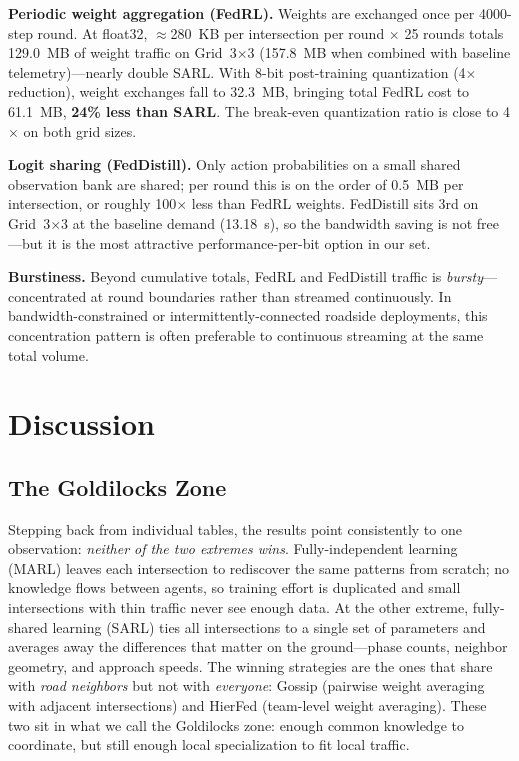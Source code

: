 \documentclass[conference]{IEEEtran}
\begin{document}
\textbf{Periodic weight aggregation (FedRL).} Weights are exchanged once per 4000-step round. At float32, $\approx$280~KB per intersection per round $\times$ 25 rounds totals 129.0~MB of weight traffic on Grid~3$\times$3 (157.8~MB when combined with baseline telemetry)---nearly double SARL. With 8-bit post-training quantization (4$\times$ reduction), weight exchanges fall to 32.3~MB, bringing total FedRL cost to 61.1~MB, \textbf{24\% less than SARL}. The break-even quantization ratio is close to 4$\times$ on both grid sizes.

\textbf{Logit sharing (FedDistill).} Only action probabilities on a small shared observation bank are shared; per round this is on the order of 0.5~MB per intersection, or roughly 100$\times$ less than FedRL weights. FedDistill sits 3rd on Grid~3$\times$3 at the baseline demand (13.18~s), so the bandwidth saving is not free---but it is the most attractive performance-per-bit option in our set.

\textbf{Burstiness.} Beyond cumulative totals, FedRL and FedDistill traffic is \emph{bursty}---concentrated at round boundaries rather than streamed continuously. In bandwidth-constrained or intermittently-connected roadside deployments, this concentration pattern is often preferable to continuous streaming at the same total volume.

\section{Discussion}\label{sec:discussion}

\subsection{The Goldilocks Zone}
Stepping back from individual tables, the results point consistently to one observation: \emph{neither of the two extremes wins}. Fully-independent learning (MARL) leaves each intersection to rediscover the same patterns from scratch; no knowledge flows between agents, so training effort is duplicated and small intersections with thin traffic never see enough data. At the other extreme, fully-shared learning (SARL) ties all intersections to a single set of parameters and averages away the differences that matter on the ground---phase counts, neighbor geometry, and approach speeds. The winning strategies are the ones that share with \emph{road neighbors} but not with \emph{everyone}: Gossip (pairwise weight averaging with adjacent intersections) and HierFed (team-level weight averaging). These two sit in what we call the Goldilocks zone: enough common knowledge to coordinate, but still enough local specialization to fit local traffic.
\end{document}
